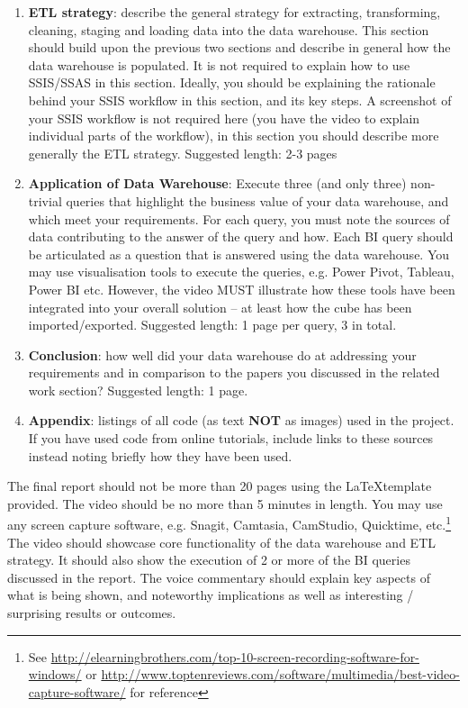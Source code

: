 \documentclass{article}[a4paper,12pt]
\begin{document}
\begin{enumerate}
\item \textbf{ETL strategy}: describe the general strategy for extracting, transforming, cleaning, staging and loading data into the data warehouse. This section should build upon the previous two sections and describe in general how the data warehouse is populated. It is not required to explain how to use SSIS/SSAS in this section. Ideally, you should be explaining the rationale behind your SSIS workflow in this section, and its key steps. A screenshot of your SSIS workflow is not required here (you have the video to explain individual parts of the workflow), in this section you should describe more generally the ETL strategy. Suggested length: 2-3 pages
\item \textbf{Application of Data Warehouse}: Execute three (and only three) non-trivial queries that highlight the business value of your data warehouse, and which meet your requirements. For each query, you must note the sources of data contributing to the answer of the query and how. Each BI query should be articulated as a question that is answered using the data warehouse. You may use visualisation tools to execute the queries, e.g. Power Pivot, Tableau, Power BI etc. However, the video MUST illustrate how these tools have been integrated into your overall solution – at least how the cube has been imported/exported. Suggested length: 1 page per query, 3 in total.
\item \textbf{Conclusion}: how well did your data warehouse do at addressing your requirements and in comparison to the papers you discussed in the related work section? Suggested length: 1 page.
\item \textbf{Appendix}: listings of all code (as text \textbf{NOT} as images) used in the project. If you have used code from online tutorials, include links to these sources instead noting briefly how they have been used. 
\end{enumerate}

The final report should not be more than 20 pages using the \LaTeX template provided. The video should be no more than 5 minutes in length. You may use any screen capture software, e.g. Snagit, Camtasia, CamStudio, Quicktime, etc.\footnote{See \url{http://elearningbrothers.com/top-10-screen-recording-software-for-windows/} or \url{http://www.toptenreviews.com/software/multimedia/best-video-capture-software/} for reference}  The video should showcase core functionality of the data warehouse and ETL strategy. It should also show the execution of 2 or more of the BI queries discussed in the report. The voice commentary should explain key aspects of what is being shown, and noteworthy implications as well as interesting / surprising results or outcomes. 
\end{document}
